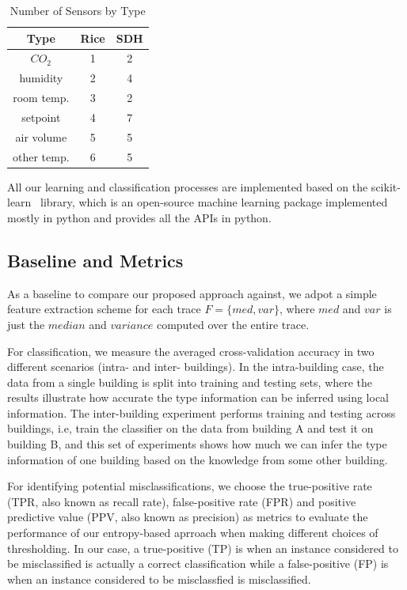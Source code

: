\begin{table}[ht!]
\caption{Number of Sensors by Type}
\centering %
\begin{tabular}{c c c}%
\hline %
Type & Rice & SDH \\ %
\hline\hline %
$CO_{2}$ & 1 & 2 \\ %
humidity & 2 & 4 \\
room temp. & 3 & 2 \\
setpoint & 4 & 7 \\
air volume & 5 & 5 \\ 
other temp. & 6 & 5 \\ \hline
\end{tabular}
\label{table:spec} %
\end{table}

All our learning and classification processes are implemented based on the scikit-learn~\cite{scikit} library, which is an open-source machine learning package implemented mostly in python and provides all the APIs in python.

\subsection{Baseline and Metrics}
As a baseline to compare our proposed approach against, we adpot a simple feature extraction scheme for each trace $F=\{med, var\}$, where $med$ and $var$ is just the $median$ and $variance$ computed over the entire trace.

For classification, we measure the averaged cross-validation accuracy in two different scenarios (intra- and inter- buildings). In the intra-building case, the 
data from a single building is split into training and testing sets, where the results illustrate how accurate the type information can be inferred using local 
information. The inter-building experiment performs training and testing across buildings, i.e, train the classifier on the data from building A and test it 
on building B, and this set of experiments shows how much we can infer the type information of one building based on the knowledge from some other building.

For identifying potential misclassifications, we choose the true-positive rate (TPR, also known as recall rate), false-positive rate (FPR) and positive predictive 
value (PPV, also known as precision) as metrics to evaluate the performance of our entropy-based aprroach when making different choices of thresholding. In our 
case, a true-positive (TP) is when an instance considered to be misclassified is actually a correct classification while a false-positive (FP) is when an instance 
considered to be misclassfied is misclassified.

